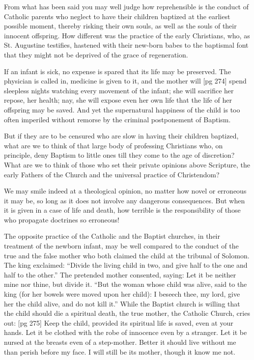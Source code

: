 From what has been said you may well judge
how reprehensible is the conduct of Catholic parents
who neglect to have their children baptized
at the earliest possible moment, thereby risking
their own souls, as well as the souls of their innocent
offspring. How different was the practice
of the early Christians, who, as St. Augustine
testifies, hastened with their new-born babes to
the baptismal font that they might not be deprived
of the grace of regeneration.

If an infant is sick, no expense is spared that
its life may be preserved. The physician is called
in, medicine is given to it, and the mother will
[pg 274]
spend sleepless nights watching every movement
of the infant; she will sacrifice her repose, her
health; nay, she will expose even her own life
that the life of her offspring may be saved. And
yet the supernatural happiness of the child is
too often imperiled without remorse by the criminal
postponement of Baptism.

But if they are to be censured who are slow
in having their children baptized, what are we
to think of that large body of professing Christians
who, on principle, deny Baptism to little
ones till they come to the age of discretion? What
are we to think of those who set their private
opinions above Scripture, the early Fathers of
the Church and the universal practice of Christendom?

We may smile indeed at a theological opinion,
no matter how novel or erroneous it may be, so
long as it does not involve any dangerous consequences.
But when it is given in a case of life
and death, how terrible is the responsibility of
those who propagate doctrines so erroneous!

The opposite practice of the Catholic and the
Baptist churches, in their treatment of the newborn
infant, may be well compared to the conduct
of the true and the false mother who both claimed
the child at the tribunal of Solomon. The king
exclaimed: “Divide the living child in two, and
give half to the one and half to the other.” The
pretended mother consented, saying: Let it be
neither mine nor thine, but divide it. “But the
woman whose child was alive, said to the king
(for her bowels were moved upon her child): I
beseech thee, my lord, give her the child alive,
and do not kill it.” While the Baptist church is
willing that the child should die a spiritual death,
the true mother, the Catholic Church, cries out:
[pg 275]
Keep the child, provided its spiritual life is saved,
even at your hands. Let it be clothed with the
robe of innocence even by a stranger. Let it be
nursed at the breasts even of a step-mother. Better
it should live without me than perish before
my face. I will still be its mother, though it
know me not.

